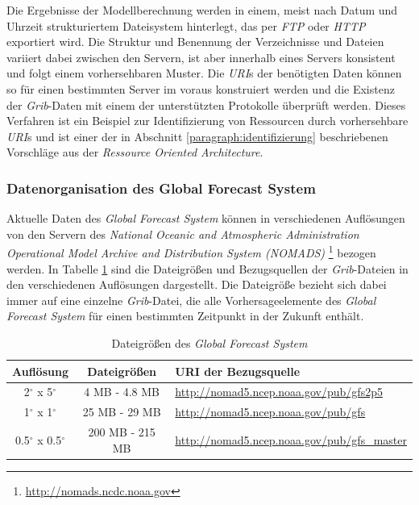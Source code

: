 Die Ergebnisse der Modellberechnung werden in einem, meist nach Datum
und Uhrzeit strukturiertem Dateisystem hinterlegt, das per
\textit{FTP} oder \textit{HTTP} exportiert wird. Die Struktur und
Benennung der Verzeichnisse und Dateien variiert dabei zwischen den
Servern, ist aber innerhalb eines Servers konsistent und folgt einem
vorhersehbaren Muster. Die \textit{URI}s der benötigten Daten können
so für einen bestimmten Server im voraus konstruiert werden und die
Existenz der \textit{Grib}-Daten mit einem der unterstützten
Protokolle überprüft werden. Dieses Verfahren ist ein Beispiel zur
Identifizierung von Ressourcen durch vorhersehbare \textit{URI}s und
ist einer der in Abschnitt \ref{paragraph:identifizierung}
beschriebenen Vorschläge aus der \textit{Ressource Oriented
  Architecture}.

\subsubsection{Datenorganisation des Global Forecast System}
Aktuelle Daten des \textit{Global Forecast System} können in
verschiedenen Auflösungen von den Servern des \textit{National Oceanic
  and Atmospheric Administration Operational Model Archive and
  Distribution System (NOMADS)} 
\footnote{\url{http://nomads.ncdc.noaa.gov}} bezogen werden. In
Tabelle \ref{tab:gfs_auflösungen} sind die Dateigrößen und
Bezugsquellen der \textit{Grib}-Dateien in den verschiedenen
Auflösungen dargestellt. Die Dateigröße bezieht sich dabei immer auf
eine einzelne \textit{Grib}-Datei, die alle Vorhersageelemente des
\textit{Global Forecast System} für einen bestimmten Zeitpunkt in der
Zukunft enthält.

\begin{table}[h]
  \centering
  {\sf
    \footnotesize
    \begin{longtable}{@{}ccl}

      \toprule
      \textbf{Auflösung} & \textbf{Dateigrößen} & \textbf{URI der Bezugsquelle} \\

      \midrule

      2$^{\circ}$ x 5$^{\circ}$ & 4 MB - 4.8 MB & \url{http://nomad5.ncep.noaa.gov/pub/gfs2p5} \\
      1$^{\circ}$ x 1$^{\circ}$ & 25 MB - 29 MB & \url{http://nomad5.ncep.noaa.gov/pub/gfs} \\
      0.5$^{\circ}$ x 0.5$^{\circ}$ & 200 MB - 215 MB & \url{http://nomad5.ncep.noaa.gov/pub/gfs_master} \\

      \bottomrule

    \end{longtable}
  }

  \caption{Dateigrößen des \textit{Global Forecast System}}
  \label{tab:gfs_auflösungen}

\end{table}


